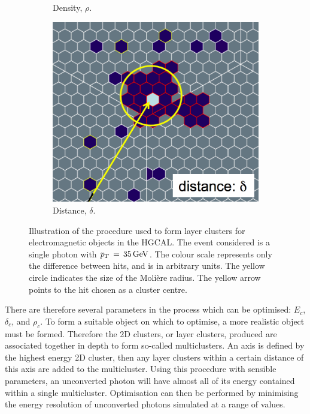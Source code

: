 \begin{figure}[h!]
\begin{subfigure}{0.292\textwidth}
    \caption{Density, $\rho$.}
  \end{subfigure}
  \begin{subfigure}{0.3\textwidth}
    \includegraphics[width=\textwidth]{Figures/HGCAL/ClusteringAlgo_Distance.png}
    \caption{Distance, $\delta$.}
  \end{subfigure}
  \caption[Illustration of the imagine algorithm used for HGCAL layer clustering.] %
  {
    Illustration of the procedure used to form layer clusters for electromagnetic objects in the HGCAL.
    The event considered is a single photon with $p_T\,=\,\SI{35}{GeV}$.
    The colour scale represents only the difference between hits, and is in arbitrary units.
    The yellow circle indicates the size of the Moli\`ere radius.
    The yellow arrow points to the hit chosen as a cluster centre.
  }
  \label{fig:hgcal_clustering}
\end{figure}

There are therefore several parameters in the process which can be optimised: $E_c$, $\delta_c$, and $\rho_c$.
To form a suitable object on which to optimise, a more realistic object must be formed.
Therefore the 2D clusters, or layer clusters, produced are associated together in depth to form so-called multiclusters. 
An axis is defined by the highest energy 2D cluster, then any layer clusters within a certain distance of this axis are added to the multicluster.
Using this procedure with sensible parameters, an unconverted photon will have almost all of its energy contained within a single multicluster.
Optimisation can then be performed by minimising the energy resolution of unconverted photons simulated at a range of \pt values.

